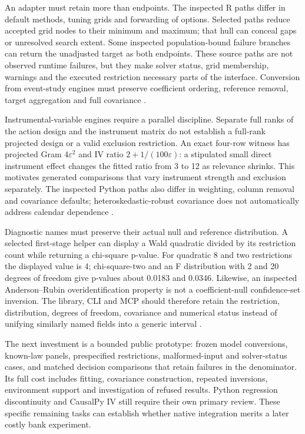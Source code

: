 An adapter must retain more than endpoints. The inspected R paths differ
in default methods, tuning grids and forwarding of options. Selected
paths reduce accepted grid nodes to their minimum and maximum; that hull
can conceal gaps or unresolved search extent. Some inspected
population-bound failure branches can return the unadjusted target as
both endpoints. These source paths are not observed runtime failures,
but they make solver status, grid membership, warnings and the executed
restriction necessary parts of the interface. Conversion from
event-study engines must preserve coefficient ordering, reference
removal, target aggregation and full covariance
\citep{exec22_honestdid_engine,exec22_honestdid_bridges}.

Instrumental-variable engines require a parallel discipline. Separate
full ranks of the action design and the instrument matrix do not
establish a full-rank projected design or a valid exclusion restriction.
An exact four-row witness has projected Gram \(4\varepsilon^2\) and IV
ratio \(2+1/(100\varepsilon)\): a stipulated small direct instrument
effect changes the fitted ratio from 3 to 12 as relevance shrinks. This
motivates generated comparisons that vary instrument strength and
exclusion separately. The inspected Python paths also differ in
weighting, column removal and covariance defaults;
heteroskedastic-robust covariance does not automatically address
calendar dependence
\citep{exec22_pyiv_kernels_linearmodels,exec22_pyiv_kernels_pyfixest,exec22_pyiv_reference}.

Diagnostic names must preserve their actual null and reference
distribution. A selected first-stage helper can display a Wald quadratic
divided by its restriction count while returning a chi-square p-value.
For quadratic 8 and two restrictions the displayed value is 4;
chi-square-two and an F distribution with 2 and 20 degrees of freedom
give p-values about 0.0183 and 0.0346. Likewise, an inspected
Anderson--Rubin overidentification property is not a coefficient-null
confidence-set inversion. The library, CLI and MCP should therefore
retain the restriction, distribution, degrees of freedom, covariance and
numerical status instead of unifying similarly named fields into a
generic interval
\citep{exec22_pyiv_kernels_pyfixest,exec22_pyiv_diagnostics_linearmodels,exec22_pyiv_reference}.

The next investment is a bounded public prototype: frozen model
conversions, known-law panels, prespecified restrictions,
malformed-input and solver-status cases, and matched decision
comparisons that retain failures in the denominator. Its full cost
includes fitting, covariance construction, repeated inversions,
environment support and investigation of refused results. Python
regression discontinuity and CausalPy IV still require their own primary
review. These specific remaining tasks can establish whether native
integration merits a later costly bank experiment.

